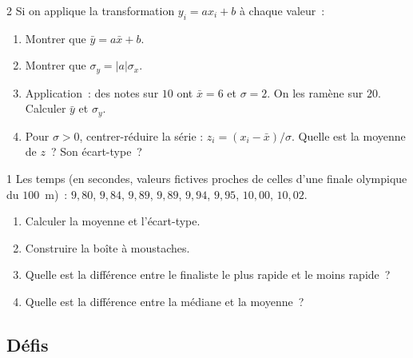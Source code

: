 \begin{probleme}{2}
Si on applique la transformation $y_i = ax_i + b$ \`a chaque valeur~:
\begin{enumerate}
  \item Montrer que $\bar{y} = a\bar{x} + b$.
  \item Montrer que $\sigma_y = |a|\sigma_x$.
  \item Application~: des notes sur $10$ ont $\bar{x}=6$ et $\sigma=2$.
        On les ramène sur $20$. Calculer $\bar{y}$ et $\sigma_y$.
  \item Pour $\sigma>0$, centrer-r\'eduire la s\'erie : $z_i=(x_i-\bar{x})/\sigma$.
        Quelle est la moyenne de $z$~? Son \'ecart-type~?
\end{enumerate}
\end{probleme}

\begin{probleme}{1}
Les temps (en secondes, valeurs fictives proches de celles d'une finale olympique du $100$~m)~:
$9{,}80$, $9{,}84$, $9{,}89$, $9{,}89$, $9{,}94$, $9{,}95$, $10{,}00$, $10{,}02$.
\begin{enumerate}
  \item Calculer la moyenne et l'\'ecart-type.
  \item Construire la bo\^ite \`a moustaches.
  \item Quelle est la diff\'erence entre le finaliste le plus rapide
        et le moins rapide~?
  \item Quelle est la diff\'erence entre la m\'ediane et la moyenne~?
\end{enumerate}
\end{probleme}

\subsection*{D\'efis}

